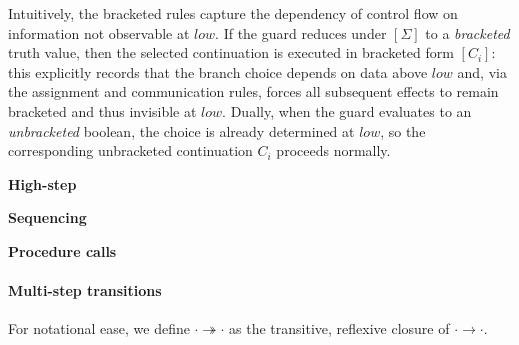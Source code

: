\documentclass[12pt,a4paper,twoside]{book}
\begin{document}
Intuitively, the bracketed rules capture the dependency of control flow on information not observable at \(low\). If the guard reduces under \([\Sigma]\) to a \emph{bracketed} truth value, then the selected continuation is executed in bracketed form \([C_i]\): this explicitly records that the branch choice depends on data above \(low\) and, via the assignment and communication rules, forces all subsequent effects to remain bracketed and thus invisible at \(low\). Dually, when the guard evaluates to an \emph{unbracketed} boolean, the choice is already determined at \(low\), so the corresponding unbracketed continuation \(C_i\) proceeds normally.

\noindent\textbf{High-step}
\begin{mathpar}

\end{mathpar}

\noindent\textbf{Sequencing}
\begin{mathpar}

\end{mathpar}

\noindent\textbf{Procedure calls}
\begin{mathpar}
\end{mathpar}

\paragraph{Multi-step transitions}
For notational ease, we define $\cdot \twoheadrightarrow \cdot$ as the transitive, reflexive closure of $\cdot \rightarrow \cdot$.
\end{document}
